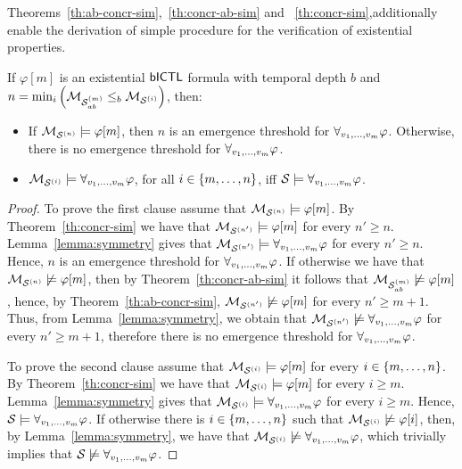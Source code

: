 
Theorems~\ref{th:ab-concr-sim},~\ref{th:concr-ab-sim} and
~\ref{th:concr-sim},additionally enable the derivation of  simple procedure
for the verification of existential properties.

\begin{corollary}
\label{cor:existential}
If $\varphi[m]$ is an existential $\sf{bICTL}$ formula with temporal depth $b$ and  $n
= \min_i \left( \mathcal{M}_{\mathcal{S}_{ab}^{(m)}} \leq_b \mathcal{M}_{\mathcal{S}^{(i)}} \right)$, then:
\begin{itemize}[$\bullet$]
\item If $\mathcal{M}_{\mathcal{S}^{(n)}} \models \varphi[m]$, then $n$ is an emergence threshold for
$\forall_{v_1,\ldots,v_m} \varphi$. Otherwise, there is no emergence threshold for $\forall_{v_1,\ldots,v_m} \varphi$.

\item $\mathcal{M}_{\mathcal{S}^{(i)}} \models \forall_{v_1,\ldots,v_m} \varphi$, for all $i \in \left \{ m, \ldots, n \right \}$, iff
$\mathcal S \models \forall_{v_1,\ldots,v_m} \varphi$.
\end{itemize}
\end{corollary}
\begin{proof}
To prove the first clause assume that $\mathcal{M}_{\mathcal{S}^{(n)}} \models \varphi[m]$. By
Theorem~\ref{th:concr-sim} we have that $\mathcal{M}_{\mathcal{S}^{(n')}} \models \varphi[m]$ for every
$n' \geq n$. Lemma~\ref{lemma:symmetry} gives that  $\mathcal{M}_{\mathcal{S}^{(n')}} \models
\forall_{v_1,\ldots,v_m} \varphi$ for every $n' \geq n$. Hence, $n$ is an emergence threshold for
$\forall_{v_1,\ldots,v_m} \varphi$. If otherwise we have that  $\mathcal{M}_{\mathcal{S}^{(n)}} \not \models \varphi[m]$, then
by Theorem~\ref{th:concr-ab-sim} it follows  that $\mathcal{M}_{\mathcal{S}_{ab}^{(m)}} \not \models
\varphi[m]$, hence, by Theorem~\ref{th:ab-concr-sim}, $\mathcal{M}_{\mathcal{S}^{(n')}} \not \models
\varphi[m]$ for every $n' \geq m+1$.  Thus, from Lemma~\ref{lemma:symmetry}, we
obtain that $\mathcal{M}_{\mathcal{S}^{(n')}} \not \models \forall_{v_1,\ldots,v_m} \varphi$ for every $n' \geq m + 1$,
therefore there is no emergence threshold for $\forall_{v_1,\ldots,v_m} \varphi$.

To prove the second clause assume that $\mathcal{M}_{\mathcal{S}^{(i)}} \models \varphi[m]$ for every $i
\in \left \{ m,\ldots,n \right \}$.  By Theorem~\ref{th:concr-sim} we have that $\mathcal{M}_{\mathcal{S}^{(i)}}
\models \varphi[m]$ for every $i \geq m$. Lemma~\ref{lemma:symmetry} gives that
$\mathcal{M}_{\mathcal{S}^{(i)}} \models \forall_{v_1,\ldots,v_m} \varphi$ for every $i \geq m$. Hence, $\mathcal S \models
\forall_{v_1,\ldots,v_m} \varphi$.  If otherwise there is $i \in \left \{ m, \ldots, n \right \}$ such that $\mathcal{M}_{\mathcal{S}^{(i)}} \not \models \varphi[i]$, then, by Lemma~\ref{lemma:symmetry}, we have that
$\mathcal{M}_{\mathcal{S}^{(i)}} \not \models \forall_{v_1,\ldots,v_m} \varphi$, which trivially implies that $\mathcal S \not
\models \forall_{v_1,\ldots,v_m} \varphi$.
\end{proof}

